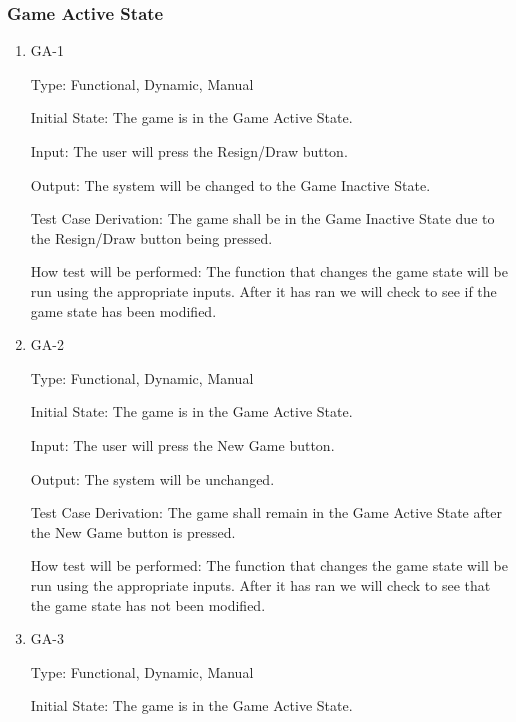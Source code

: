 \documentclass[12pt, titlepage]{article}
\begin{document}
  \subsubsection{Game Active State}
  
  \begin{enumerate}
  
  \item{GA-1\\}
  
  Type: Functional, Dynamic, Manual
                      
  Initial State: The game is in the Game Active State.
                      
  Input: The user will press the Resign/Draw button.
                      
  Output: The system will be changed to the Game Inactive State.
                      
  Test Case Derivation: The game shall be in the Game Inactive State due to the Resign/Draw button being pressed.
  
  How test will be performed: The function that changes the game state will be run using the appropriate inputs.
  After it has ran we will check to see if the game state has been modified.
  
  \item{GA-2\\}
  
  Type: Functional, Dynamic, Manual
                      
  Initial State: The game is in the Game Active State.
                      
  Input: The user will press the New Game button.
                      
  Output: The system will be unchanged.
                      
  Test Case Derivation: The game shall remain in the Game Active State after the New Game button is pressed.
  
  How test will be performed: The function that changes the game state will be run using the appropriate inputs.
  After it has ran we will check to see that the game state has not been modified.
  
  \item{GA-3\\}
  
  Type: Functional, Dynamic, Manual
                      
  Initial State: The game is in the Game Active State.
                      

\end{enumerate}
\end{document}
